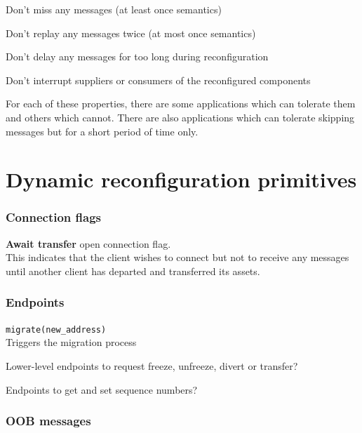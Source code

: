 \documentclass[12pt,a4paper,twoside]{article}
\renewcommand{\_}{\texttt{\symbol{95}}}
\begin{document}
\begin{bulletlist}
\item Don't miss any messages (at least once semantics)
\item Don't replay any messages twice (at most once semantics)
\item Don't delay any messages for too long during reconfiguration
\item Don't interrupt suppliers or consumers of the reconfigured
		components
\end{bulletlist}

For each of these properties, there are some applications which can tolerate
them and others which cannot. There are also applications which can tolerate
skipping messages but for a short period of time only.

\section{Dynamic reconfiguration primitives}

\subsubsection*{Connection flags}

\begin{bulletlist}
\item \textbf{Await transfer} open connection flag.\\
	This indicates that the client wishes to connect but not to
	receive any messages until another client has departed and
	transferred its assets.
\end{bulletlist}

\subsubsection*{Endpoints}

\begin{bulletlist}
\item \verb^migrate(new_address)^\\
	Triggers the migration process
\item Lower-level endpoints to request freeze, unfreeze, divert or transfer?
\item Endpoints to get and set sequence numbers?
\end{bulletlist}

\subsubsection*{OOB messages}
\end{document}
